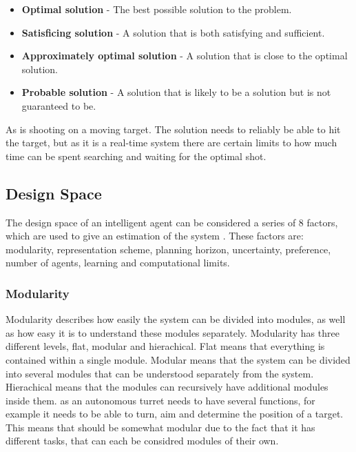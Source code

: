 \begin{itemize}
  \item \textbf{Optimal solution} - The best possible solution to the problem.
  \item \textbf{Satisficing solution} - A solution that is both satisfying and
  sufficient.
  \item \textbf{Approximately optimal solution} - A solution that is close to
  the optimal solution.
  \item \textbf{Probable solution} - A solution that is likely to be a solution
  but is not guaranteed to be.
\end{itemize}

As \name is shooting on a moving target. The solution needs to reliably be able
to hit the target, but as it is a real-time system there are certain limits to
how much time can be spent searching and waiting for the optimal shot.

\subsection{Design Space}
The design space of an intelligent agent can be considered a series of 8
factors, which are used to give an estimation of the system \citep[Chap
1.5]{MIBook}. These factors are: modularity, representation scheme, planning
horizon, uncertainty, preference, number of agents, learning and computational
limits.

\subsubsection{Modularity}
Modularity describes how easily the system can be divided into modules, as well
as how easy it is to understand these modules separately. Modularity has three
different levels, flat, modular and hierachical. Flat means that everything is
contained within a single module. Modular means that the system can be divided
into several modules that can be understood separately from the system.
Hierachical means that the modules can recursively have additional modules
inside them. \name as an autonomous turret needs to have several functions, for
example it needs to be able to turn, aim and determine the position of a target.
This means that \name should be somewhat modular due to the fact that it has
different tasks, that can each be considred modules of their own.

